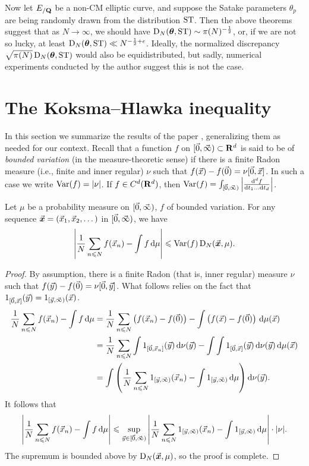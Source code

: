Now let $E_{/\mathbf{Q}}$ be a non-CM elliptic curve, and suppose the Satake parameters 
$\theta_p$ are being randomly drawn from the distribution $\mathrm{ST}$. Then the 
above theorems suggest that as $N\to \infty$, we should have 
$\operatorname{D}_N({\boldsymbol\theta},\mathrm{ST})\sim \pi(N)^{-\frac 1 2}$, or, if we are not so lucky, at 
least $\operatorname{D}_N({\boldsymbol\theta},\mathrm{ST}) \ll N^{-\frac 1 2+\epsilon}$. Ideally, the 
normalized discrepancy $\sqrt{\pi(N)}\operatorname{D}_N({\boldsymbol\theta},\mathrm{ST})$ would also 
be equidistributed, but sadly, numerical experiments conducted by the author 
suggest this is not the case. 





\section{The Koksma--Hlawka inequality}

In this section we summarize the results of the paper \cite{okten-1999}, 
generalizing them as needed for our context. Recall that a function $f$ on 
$[\vec{0},\vec{\infty})\subset \mathbf{R}^d$ is said to be of \emph{bounded variation} (in 
the measure-theoretic sense) if there is a finite Radon measure (i.e., 
finite and inner regular) $\nu$ such that 
$f(\vec{x}) - f(\vec{0}) = \nu[\vec{0},\vec{x}]$. In such a case we write 
$\operatorname{Var}(f) = |\nu|$. If $f\in C^d(\mathbf{R}^d)$, then 
$\operatorname{Var}(f) = \int_{[\vec{0},\vec{\infty})} \left|\frac{\mathrm{d}^d f}{\mathrm{d} t_1 \dots \mathrm{d} t_d} \right|$. 

\begin{theorem}\label{thm:koksma-hlawka}
Let $\mu$ be a probability measure on $[\vec{0},\vec{\infty})$, $f$ of bounded 
variation. For any sequence $\vec{\boldsymbol x} = (\vec{x}_1,\vec{x}_2,\dots)$ in $[\vec{0},\vec{\infty})$, 
we have 
\[
	\left| \frac{1}{N} \sum_{n\leqslant N} f(\vec{x}_n) - \int f\, \mathrm{d}\mu \right| \leqslant \operatorname{Var}(f) \operatorname{D}_N(\vec{\boldsymbol x},\mu) .
\]
\end{theorem}
\begin{proof}
By assumption, there is a finite Radon (that is, inner regular) measure $\nu$ 
such that $f(\vec{y}) - f(\vec{0}) = \nu[\vec{0},\vec{y}]$. What follows relies on the 
fact that $1_{[\vec{0},\vec{x}]}(\vec{y}) = 1_{[\vec{y},\vec{\infty})}(\vec{x})$. 
\begin{align*}
	\frac{1}{N} \sum_{n\leqslant N} f(\vec{x}_n) - \int f\, \mathrm{d}\mu 
		&= \frac{1}{N} \sum_{n\leqslant N} \left(f(\vec{x}_n) - f(\vec{0})\right) - \int \left(f(\vec{x}) - f(\vec{0})\right)\, \mathrm{d}\mu(\vec{x}) \\
		&= \frac{1}{N} \sum_{n\leqslant N} \int 1_{[\vec{0},\vec{x}_n]}(\vec{y})\, \mathrm{d} \nu(\vec{y}) - \int \int 1_{[\vec{0},\vec{x}]}(\vec{y})\, \mathrm{d}\nu(\vec{y}) \, \mathrm{d}\mu(\vec{x}) \\
		&= \int \left(\frac{1}{N} \sum_{n\leqslant N} 1_{[\vec{y},\vec{\infty})}(\vec{x}_n) - \int 1_{[\vec{y},\vec{\infty})}\, \mathrm{d}\mu \right) \mathrm{d}\nu(\vec{y}) .
\end{align*}
It follows that 
\[
	\left| \frac{1}{N} \sum_{n\leqslant N} f(\vec{x}_n) - \int f\, \mathrm{d}\mu \right|
		\leqslant \sup_{\vec{y}\in [\vec{0},\vec{\infty})} \left| \frac{1}{N} \sum_{n\leqslant N} 1_{[\vec{y},\vec{\infty})}(\vec{x}_n) - \int 1_{[\vec{y},\vec{\infty})}\, \mathrm{d}\mu\right| \cdot |\nu| .
\]
The supremum is bounded above by $\operatorname{D}_N(\vec{\boldsymbol x},\mu)$, so the proof is complete. 
\end{proof}

